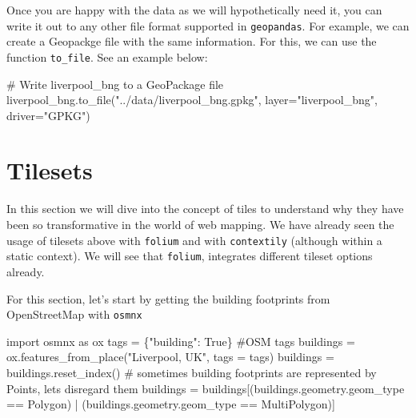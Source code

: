\documentclass[
  letterpaper,
  DIV=11,
  numbers=noendperiod]{scrreprt}
\newenvironment{Shaded}{\begin{snugshade}}{\end{snugshade}}
\newcommand{\CommentTok}[1]{\textcolor[rgb]{0.37,0.37,0.37}{#1}}
\newcommand{\ImportTok}[1]{\textcolor[rgb]{0.00,0.46,0.62}{#1}}
\newcommand{\NormalTok}[1]{\textcolor[rgb]{0.00,0.23,0.31}{#1}}
\newcommand{\OperatorTok}[1]{\textcolor[rgb]{0.37,0.37,0.37}{#1}}
\newcommand{\StringTok}[1]{\textcolor[rgb]{0.13,0.47,0.30}{#1}}
\newcommand{\VariableTok}[1]{\textcolor[rgb]{0.07,0.07,0.07}{#1}}
\begin{document}
Once you are happy with the data as we will hypothetically need it, you
can write it out to any other file format supported in
\texttt{geopandas}. For example, we can create a Geopackge file with the
same information. For this, we can use the function \texttt{to\_file}.
See an example below:

\begin{Shaded}
\begin{Highlighting}[]
\CommentTok{\# Write \textquotesingle{}liverpool\_bng\textquotesingle{} to a GeoPackage file}
\NormalTok{liverpool\_bng.to\_file(}\StringTok{"../data/liverpool\_bng.gpkg"}\NormalTok{, layer}\OperatorTok{=}\StringTok{"liverpool\_bng"}\NormalTok{, driver}\OperatorTok{=}\StringTok{"GPKG"}\NormalTok{)}
\end{Highlighting}
\end{Shaded}

\section{Tilesets}\label{tilesets}

In this section we will dive into the concept of tiles to understand why
they have been so transformative in the world of web mapping. We have
already seen the usage of tilesets above with \texttt{folium} and with
\texttt{contextily} (although within a static context). We will see that
\texttt{folium}, integrates different tileset options already.

For this section, let's start by getting the building footprints from
OpenStreetMap with \texttt{osmnx}

\begin{Shaded}
\begin{Highlighting}[]
\ImportTok{import}\NormalTok{ osmnx }\ImportTok{as}\NormalTok{ ox}
\NormalTok{tags }\OperatorTok{=}\NormalTok{ \{}\StringTok{"building"}\NormalTok{: }\VariableTok{True}\NormalTok{\} }\CommentTok{\#OSM tags}
\NormalTok{buildings }\OperatorTok{=}\NormalTok{ ox.features\_from\_place(}\StringTok{"Liverpool, UK"}\NormalTok{, tags }\OperatorTok{=}\NormalTok{ tags) }
\NormalTok{buildings }\OperatorTok{=}\NormalTok{ buildings.reset\_index()}
 \CommentTok{\# sometimes building footprints are represented by Points, let\textquotesingle{}s disregard them}
\NormalTok{buildings }\OperatorTok{=}\NormalTok{ buildings[(buildings.geometry.geom\_type }\OperatorTok{==} \StringTok{\textquotesingle{}Polygon\textquotesingle{}}\NormalTok{) }\OperatorTok{|}\NormalTok{ (buildings.geometry.geom\_type }\OperatorTok{==} \StringTok{\textquotesingle{}MultiPolygon\textquotesingle{}}\NormalTok{)]}
\end{Highlighting}
\end{Shaded}
\end{document}

